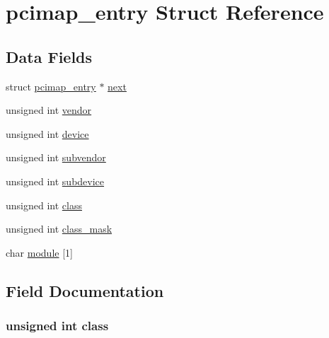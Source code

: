 \hypertarget{structpcimap__entry}{}\section{pcimap\+\_\+entry Struct Reference}
\label{structpcimap__entry}
\subsection*{Data Fields}
\begin{DoxyCompactItemize}
\item 
struct \hyperlink{structpcimap__entry}{pcimap\+\_\+entry} $\ast$ \hyperlink{structpcimap__entry_a37fe4d4d27aef0db949dce0509073849}{next}
\item 
unsigned int \hyperlink{structpcimap__entry_acc66c4a1f4c07624a40017edb0ad147f}{vendor}
\item 
unsigned int \hyperlink{structpcimap__entry_ac9fe1492f3fc88db647f830b7dad9446}{device}
\item 
unsigned int \hyperlink{structpcimap__entry_a1ace61feb68d4a8aadeebd89639b6a69}{subvendor}
\item 
unsigned int \hyperlink{structpcimap__entry_a545c60cd939fd457235a662f418d519f}{subdevice}
\item 
unsigned int \hyperlink{structpcimap__entry_a76d7130278d7705c5aa52bd16a8b04a4}{class}
\item 
unsigned int \hyperlink{structpcimap__entry_a188ef532764ec0914d2bfe5c6559ab9d}{class\+\_\+mask}
\item 
char \hyperlink{structpcimap__entry_a5e6a070c48a5b6025e0a76668f711116}{module} \mbox{[}1\mbox{]}
\end{DoxyCompactItemize}


\subsection{Field Documentation}
\subsubsection[{\texorpdfstring{class}{class}}]{\setlength{\rightskip}{0pt plus 5cm}unsigned int class}\hypertarget{structpcimap__entry_a76d7130278d7705c5aa52bd16a8b04a4}{}\label{structpcimap__entry_a76d7130278d7705c5aa52bd16a8b04a4}
